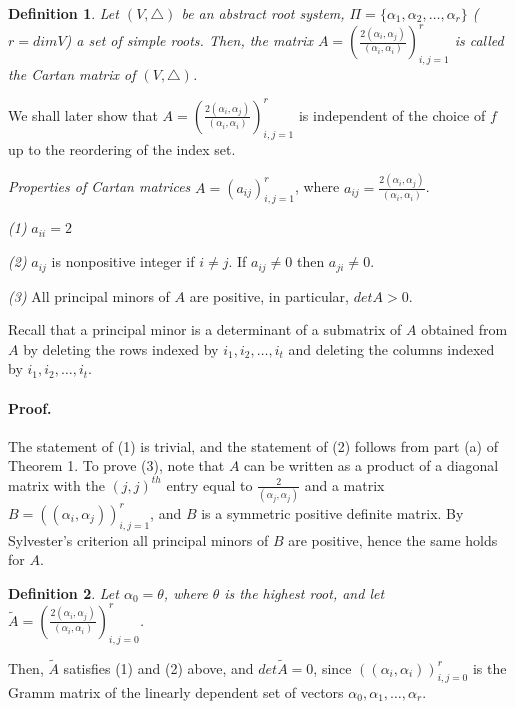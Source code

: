 \documentclass[11pt]{article}
\newtheorem{defn}{Definition}
\begin{document}
\begin{defn} Let $(V,  \bigtriangleup)$ be an abstract root system, $\Pi=\{\alpha_1, \alpha_2, \ldots, \alpha_r\}$ ($r=dimV$) a set of simple roots. Then, the matrix 
$A={(\frac{2(\alpha_i, \alpha_j)}{(\alpha_i, \alpha_i)})}^{r}_{i, j=1}$
 is called the Cartan matrix of $(V,  \bigtriangleup)$.

\end{defn}

We shall later show that $A={(\frac{2(\alpha_i, \alpha_j)}{(\alpha_i, \alpha_i)})}^{r}_{i, j=1}$
  is independent of the choice of $f$ up to the reordering of the index set. 


\textit{Properties of Cartan matrices} $A={(a_{ij})}^{r}_{i, j=1}$, where $a_{ij}=\frac{2(\alpha_i, \alpha_j)}{(\alpha_i, \alpha_i)}$. 

\textit{(1)} $a_{ii}=2$

\textit{(2)} $a_{ij}$ is nonpositive integer if $i \neq j$. If $a_{ij}\neq 0$ then $a_{ji}\neq 0$. 

\textit{(3)} All principal minors of $A$ are positive, in particular, $detA>0$. 

Recall that a principal minor is a determinant of a submatrix of $A$ obtained from $A$ by deleting the rows indexed by  $i_1, i_2, \ldots, i_t$ and deleting the 
columns indexed by  $i_1, i_2, \ldots, i_t$. 

\paragraph{Proof.} The statement of (1) is trivial, and the statement of (2) follows from part (a) of Theorem 1. To prove (3), note that $A$ can be written as a product of a diagonal matrix with the $(j, j)^{th}$ entry equal to $\frac{2}{(\alpha_j, \alpha_j)}$ and a matrix $B={((\alpha_i, \alpha_j))}^{r}_{i, j=1}$, and $B$ is a symmetric positive definite matrix. By Sylvester's criterion all principal minors of $B$ are positive, hence the same holds for $A$. 


\begin{defn}
Let $\alpha_0=\theta$, where $\theta$ is the highest root, and let 
 $\tilde{A}={(\frac{2(\alpha_i, \alpha_j)}{(\alpha_i, \alpha_i)})}^{r}_{i, j=0}$. 

\end{defn}

Then, $\tilde{A}$ satisfies (1) and (2) above, and $det\tilde{A}=0$, since  
${((\alpha_i, \alpha_i))}^{r}_{i, j=0}$ is the Gramm matrix of the linearly dependent set of vectors $\alpha_0, \alpha_1, \ldots, \alpha_r$. 
\end{document}
